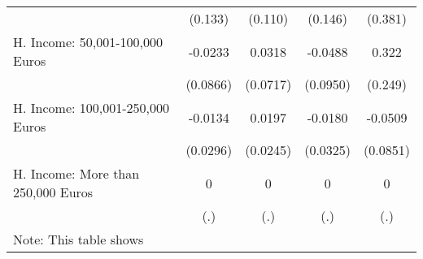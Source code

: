 {\begin{tabular}{l*{4}{c}}
            &     (0.133)         &     (0.110)         &     (0.146)         &     (0.381)         \\
[1em]
H. Income: 50,001-100,000 Euros&     -0.0233         &      0.0318         &     -0.0488         &       0.322         \\
            &    (0.0866)         &    (0.0717)         &    (0.0950)         &     (0.249)         \\
[1em]
H. Income: 100,001-250,000 Euros&     -0.0134         &      0.0197         &     -0.0180         &     -0.0509         \\
            &    (0.0296)         &    (0.0245)         &    (0.0325)         &    (0.0851)         \\
[1em]
H. Income: More than 250,000 Euros&           0         &           0         &           0         &           0         \\
            &         (.)         &         (.)         &         (.)         &         (.)         \\
\hline\hline
\multicolumn{5}{l}{\footnotesize Note: This table shows}\\
\end{tabular}
}

